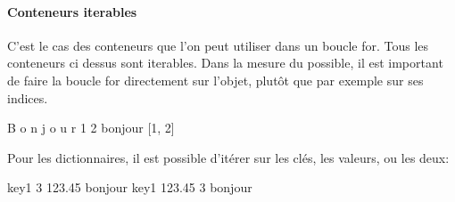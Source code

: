 \documentclass[letterpaper,10pt,english]{sphinxhowto}
\begin{document}
\begin{sphinxVerbatim}[commandchars=\\\{\}]
[1, 2, 3]
\end{sphinxVerbatim}


\paragraph{Conteneurs iterables}
\label{\detokenize{cours3_conteneur_cours:conteneurs-iterables}}
\sphinxAtStartPar
C’est le cas des conteneurs que l’on peut utiliser dans un boucle for. Tous les conteneurs ci dessus sont iterables.
Dans la mesure du possible, il est important de faire la boucle for directement sur l’objet, plutôt que par exemple sur ses indices.

\begin{sphinxVerbatim}[commandchars=\\\{\}]
   
    
   
\end{sphinxVerbatim}

\begin{sphinxVerbatim}[commandchars=\\\{\}]
B
o
n
j
o
u
r
1
2
bonjour
[1, 2]
\end{sphinxVerbatim}

\sphinxAtStartPar
Pour les dictionnaires, il est possible d’itérer sur les clés, les valeurs, ou les deux:

\begin{sphinxVerbatim}[commandchars=\\\{\}]
    
    
   
    
    
     
\end{sphinxVerbatim}

\begin{sphinxVerbatim}[commandchars=\\\{\}]
key1
3
123.45
bonjour
key1 123.45
3 bonjour
\end{sphinxVerbatim}
\end{document}
